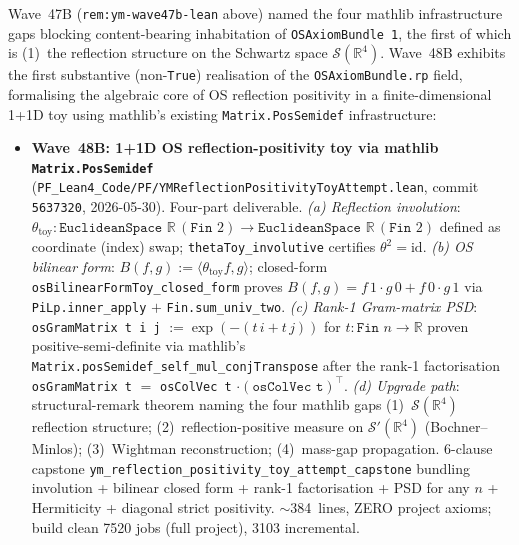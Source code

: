 \begin{remark}\label{rem:ym-wave48b-lean}
Wave~47B (\texttt{rem:ym-wave47b-lean} above) named the four mathlib infrastructure gaps blocking content-bearing inhabitation of \texttt{OSAxiomBundle 1}, the first of which is (1)~the reflection structure on the Schwartz space $\mathcal{S}(\mathbb{R}^4)$. Wave~48B exhibits the first substantive (non-\texttt{True}) realisation of the \texttt{OSAxiomBundle.rp} field, formalising the algebraic core of OS reflection positivity in a finite-dimensional 1+1D toy using mathlib's existing \texttt{Matrix.PosSemidef} infrastructure:
\begin{itemize}
  \item \textbf{Wave~48B: 1+1D OS reflection-positivity toy via mathlib \texttt{Matrix.PosSemidef}} (\texttt{PF\_Lean4\_Code/PF/YMReflectionPositivityToyAttempt.lean}, commit \texttt{5637320}, 2026-05-30). Four-part deliverable. \emph{(a) Reflection involution}: $\theta_{\mathrm{toy}} : \texttt{EuclideanSpace } \mathbb{R}\,(\texttt{Fin } 2) \to \texttt{EuclideanSpace } \mathbb{R}\,(\texttt{Fin } 2)$ defined as coordinate (index) swap; \texttt{thetaToy\_involutive} certifies $\theta^2 = \mathrm{id}$. \emph{(b) OS bilinear form}: $B(f, g) := \langle \theta_{\mathrm{toy}} f, g\rangle$; closed-form \texttt{osBilinearFormToy\_closed\_form} proves $B(f, g) = f\,1 \cdot g\,0 + f\,0 \cdot g\,1$ via \texttt{PiLp.inner\_apply} $+$ \texttt{Fin.sum\_univ\_two}. \emph{(c) Rank-1 Gram-matrix PSD}: \texttt{osGramMatrix t i j} $:= \exp(-(t\,i + t\,j))$ for $t : \texttt{Fin } n \to \mathbb{R}$ proven positive-semi-definite via mathlib's \texttt{Matrix.posSemidef\_self\_mul\_conjTranspose} after the rank-1 factorisation \texttt{osGramMatrix t} $=$ \texttt{osColVec t} $\cdot (\texttt{osColVec t})^\top$. \emph{(d) Upgrade path}: structural-remark theorem naming the four mathlib gaps (1)~$\mathcal{S}(\mathbb{R}^4)$ reflection structure; (2)~reflection-positive measure on $\mathcal{S}'(\mathbb{R}^4)$ (Bochner--Minlos); (3)~Wightman reconstruction; (4)~mass-gap propagation. 6-clause capstone \texttt{ym\_reflection\_positivity\_toy\_attempt\_capstone} bundling involution + bilinear closed form + rank-1 factorisation + PSD for any $n$ + Hermiticity + diagonal strict positivity. $\sim$384~lines, ZERO project axioms; build clean 7520 jobs (full project), 3103 incremental.
\end{itemize}

\end{remark}
